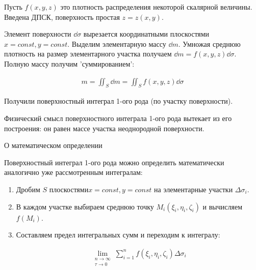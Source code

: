 
\begin{multicols}{2}
  
  \columnbreak

  Пусть \(f(x, y, z)\) это плотность распределения некоторой скалярной величины.
  Введена ДПСК, поверхность простая \(z = z(x, y)\).

  Элемент поверхности \(\dd \sigma\) вырезается координатными плоскостями
  \(x = const, y = const\). Выделим элементарную массу \(\dd  m\). Умножая
  среднюю плотность на размер элементарного участка получаем
  \(\dd m = f(x, y, z) \dd \sigma\). Полную массу получим 'суммированием':

  \begin{align*}
    m = \iint_{S} \dd m = \iint_{S} f(x, y, z) \dd \sigma
  \end{align*}

  Получили поверхностный интеграл 1-ого рода (по участку поверхности).
\end{multicols}

\begin{remark}
  Физический смысл поверхностного интеграла 1-ого рода вытекает из его
  построения: он равен массе участка неоднородной поверхности.
\end{remark}

\begin{remark}
  О математическом определении

  Поверхностный интеграл 1-ого рода можно определить математически аналогично
  уже рассмотренным интегралам:

  \begin{enumerate}
    \item Дробим \(S\) плоскостями\(x = const, y = const\) на элементарные
    участки \(\Delta \sigma_{i}\).

    \item В каждом участке выбираем среднюю точку
    \(M_{i}(\xi_{i}, \eta_{i}, \zeta_{i})\) и вычисляем \(f(M_{i})\).

    \item Составляем предел интегральных сумм и переходим к интегралу:

    \begin{align*}
      \lim_{\substack{n \to \infty \\ \tau \to 0}}
        \sum_{i = 1}^{n} f(\xi_{i}, \eta_{i}, \zeta_{i}) \Delta \sigma_{i}
    \end{align*}
  \end{enumerate}
\end{remark}

